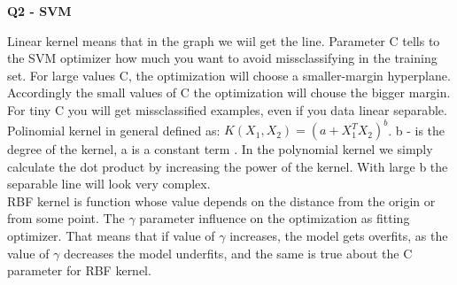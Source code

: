 \documentclass[12pt,a4paper]{article}
\begin{document}
\newpage
\begin{center}
	\textbf{Q2 - SVM}
\end{center}

Linear kernel means that in the graph we wiil get the line. Parameter C tells to the SVM optimizer how much you want to avoid missclassifying in the training set. For large values C, the optimization will choose a smaller-margin hyperplane. Accordingly the small values of C the optimization will chouse the bigger margin. For tiny C you will get missclassified examples, even if you data linear separable.\\
 Polinomial kernel in general defined as: $K(X_1,X_2) = (a+X_1^T X_2)^b$. b - is the degree of the kernel, a is a constant term \cite{svm}. In the polynomial kernel we simply calculate the dot product by increasing the power of the kernel. With large b the separable line will look very complex.\\
RBF kernel is function whose value depends on the distance from the origin or from some point. The $\gamma$ parameter influence on the optimization as fitting optimizer. That means that if value of $\gamma$  increases, the model gets overfits, as the value of $\gamma$  decreases the model underfits, and the same is true about the C parameter for RBF kernel.
\end{document}
